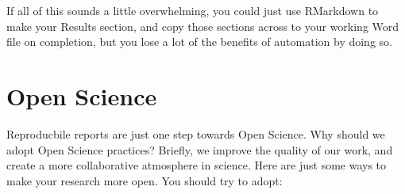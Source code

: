 \documentclass[
]{book}
\begin{document}
If all of this sounds a little overwhelming, you could just use RMarkdown to make your Results section, and copy those sections across to your working Word file on completion, but you lose a lot of the benefits of automation by doing so.

\hypertarget{open-science}{%
\section{Open Science}\label{open-science}}

Reproducbile reports are just one step towards Open Science. Why should we adopt Open Science practices? Briefly, we improve the quality of our work, and create a more collaborative atmosphere in science. Here are just some ways to make your research more open. You should try to adopt:
\end{document}
